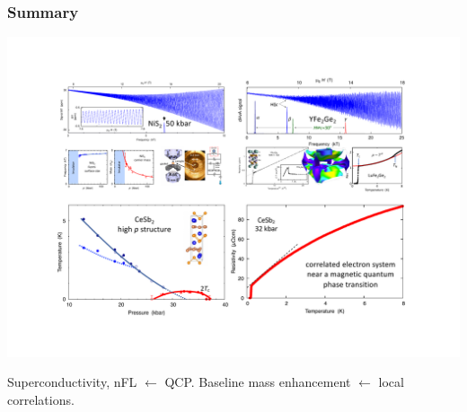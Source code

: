 

\begin{emptyframe}
\frametitle{Summary}
\centerline{\includegraphics[width=\columnwidth]{EndingPicture5.pdf}}
\centerline{\small Superconductivity, nFL $\leftarrow$ QCP. Baseline mass enhancement $\leftarrow$ local correlations.}




\end{emptyframe}
{}

